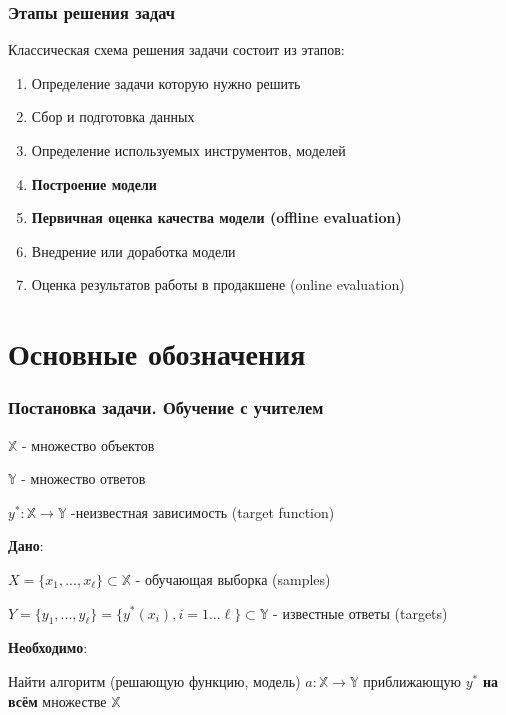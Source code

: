 \documentclass{beamer}
\begin{document}
	
	\begin{frame}
		\frametitle{Этапы решения задач}
		Классическая схема решения задачи состоит из этапов:
		\begin{enumerate}
			\item Определение задачи которую нужно решить
			\item Сбор и подготовка данных
			\item Определение используемых инструментов, моделей
			\item \textbf{Построение модели}
			\item \textbf{Первичная оценка качества модели (offline evaluation)}
			\item Внедрение или доработка модели
			\item Оценка результатов работы в продакшене (online evaluation)
			
		\end{enumerate}
	\end{frame}
	
	
	
	
	\section{Основные обозначения}
	
	
	\begin{frame}
		\frametitle{Постановка задачи. Обучение с учителем}
		
		$\mathbb{X}$ - множество объектов
		
		$\mathbb{Y}$ - множество ответов
		
		$y^{*}: \mathbb{X} \to \mathbb{Y}$ -неизвестная зависимость (target function)
		
		\vspace{15pt}
		
		\textbf{Дано}:
		
		$X = \{x_1, ..., x_\ell\} \subset \mathbb{X}$ - обучающая выборка (samples)
		
		$Y = \{y_1, ..., y_{\ell}\} = \{y^{*}(x_i), i = 1...\ell \} \subset \mathbb{Y}$ - известные ответы (targets)
		
		\vspace{5pt}
		
		\textbf{Необходимо}:
		
		Найти алгоритм (решающую функцию, модель) $a: \mathbb{X} \to \mathbb{Y}$ приближающую $y^{*}$ \textbf{на всём} множестве $\mathbb{X}$		
	\end{frame}
\end{document}
